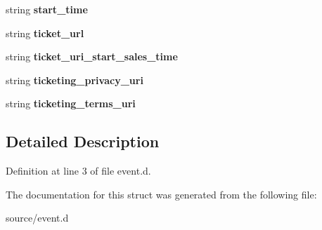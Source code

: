 \begin{DoxyCompactItemize}
\item 
\mbox{\label{structevent_1_1event_a610358a5227fe1c780ea47d48ff39cc5}} 
string {\bfseries start\+\_\+time}
\item 
\mbox{\label{structevent_1_1event_abcc19bd08e52e3b6a5c9f6bdaea48227}} 
string {\bfseries ticket\+\_\+url}
\item 
\mbox{\label{structevent_1_1event_adc40f87d95b525a795df369fc89212f8}} 
string {\bfseries ticket\+\_\+uri\+\_\+start\+\_\+sales\+\_\+time}
\item 
\mbox{\label{structevent_1_1event_ac3367cbbf13e9e4c4d0de25b25f0fcf9}} 
string {\bfseries ticketing\+\_\+privacy\+\_\+uri}
\item 
\mbox{\label{structevent_1_1event_a87d319fb6b4f1d3c972821c53e43af41}} 
string {\bfseries ticketing\+\_\+terms\+\_\+uri}
\end{DoxyCompactItemize}


\subsection{Detailed Description}


Definition at line 3 of file event.\+d.



The documentation for this struct was generated from the following file\+:\begin{DoxyCompactItemize}
\item 
source/event.\+d\end{DoxyCompactItemize}
